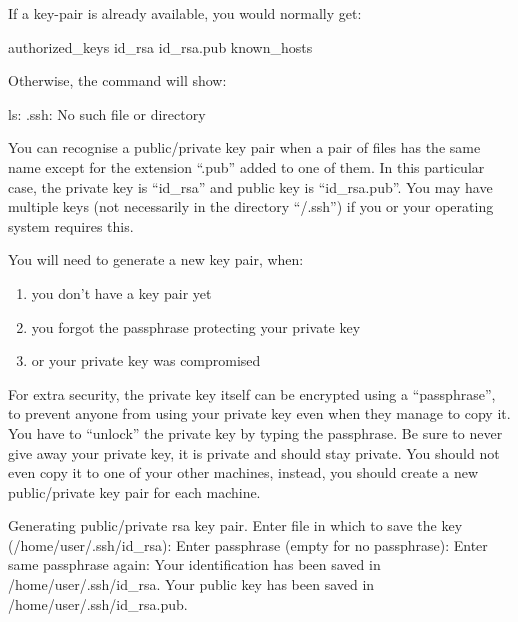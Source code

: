 \begin{prompt}
\end{prompt}


  If a key-pair is already available, you would normally get:

\begin{prompt}
authorized_keys    id_rsa            id_rsa.pub         known_hosts
\end{prompt}

  Otherwise, the command will show:

\begin{prompt}
ls: .ssh: No such file or directory
\end{prompt}

  You can recognise a public/private key pair when a pair of files has the same
  name except for the extension ``.pub'' added to one of them. In this particular
  case, the private key is ``id\_rsa'' and public key is ``id\_rsa.pub''. You may
  have multiple keys (not necessarily in the directory ``\tilde/.ssh'') if you or
  your operating system requires this.

  You will need to generate a new key pair, when:
  \begin{enumerate}
    \item  you don't have a key pair yet
    \item  you forgot the passphrase protecting your private key
    \item  or your private key was compromised
  \end{enumerate}

  For extra security, the private key itself can be encrypted using a ``passphrase'',
  to prevent anyone from using your private key even when they manage to copy
  it. You have to ``unlock'' the private key by typing the passphrase.
  Be sure to never give away your private key, it is private and should stay private.
  You should not even copy it to one of your other machines, instead, you should create a
  new public/private key pair for each machine.

\begin{prompt}
Generating public/private rsa key pair.
Enter file in which to save the key (/home/user/.ssh/id_rsa):
Enter passphrase (empty for no passphrase):
Enter same passphrase again:
Your identification has been saved in /home/user/.ssh/id_rsa.
Your public key has been saved in /home/user/.ssh/id_rsa.pub.
\end{prompt}

